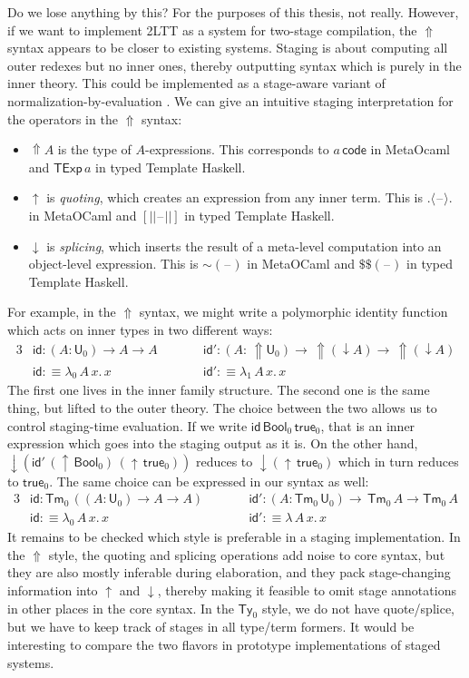 \documentclass[12pt,a4paper,twoside,openany]{book}
\theoremstyle{remark}
\theoremstyle{definition}
\theoremstyle{theorem}
\newcommand{\ms}[1]{\mathsf{#1}}
\newcommand{\id}{\mathsf{id}}
\newcommand{\Tm}{\mathsf{Tm}}
\newcommand{\Ty}{\mathsf{Ty}}
\newcommand{\U}{\mathsf{U}}
\newcommand{\blank}{\mathord{\hspace{1pt}\text{--}\hspace{1pt}}}
\newcommand{\Lift}{\Uparrow}
\newcommand{\Bool}{\ms{Bool}}
\newcommand{\true}{\ms{true}}
\newcommand{\up}{\uparrow}
\newcommand{\down}{\downarrow}
\newcommand{\lab}{\langle}
\newcommand{\rab}{\rangle}
\newcommand{\defn}{:\equiv}
\begin{document}
Do we lose anything by this? For the purposes of this thesis, not
really. However, if we want to implement 2LTT as a system for two-stage
compilation, the $\Lift$ syntax appears to be closer to existing systems.
Staging is about computing all outer redexes but no inner ones, thereby
outputting syntax which is purely in the inner theory. This could be implemented
as a stage-aware variant of normalization-by-evaluation
\cite{abel2013normalization,decidableconv,coqnbe}. We can give an intuitive
staging interpretation for the operators in the $\Lift$ syntax:
\begin{itemize}
\item
  $\Lift\!A$ is the type of $A$-expressions. This corresponds to $a\,\ms{code}$
  in MetaOcaml \cite{kiselyov14metaocaml} and $\ms{TExp}\,a$ in typed Template Haskell.
\item
  $\up$ is \emph{quoting}, which creates an expression from any inner term. This is
  $.\lab\blank\rab.$ in MetaOCaml and $[||\blank||]$ in typed Template Haskell.
\item $\down$ is \emph{splicing}, which inserts the result of a meta-level computation into
  an object-level expression. This is $\sim\!(\blank)$ in MetaOCaml and $\$\$(\blank)$ in typed Template Haskell.
\end{itemize}
For example, in the $\Lift$ syntax, we might write a polymorphic identity function
which acts on inner types in two different ways:
\begin{alignat*}{3}
  &\id : (A : \U_0) \to A \to A\hspace{2em} && \id' : (A :\,\Lift\!\U_0) \to\,\Lift\!(\down A) \to\,\Lift\!(\down A)\\
  &\id \defn \lambda_0\,A\,x.\,x && \id' \defn \lambda_1\,A\,x.\,x
\end{alignat*}
The first one lives in the inner family structure. The second one is the same
thing, but lifted to the outer theory. The choice between the two allows us to
control staging-time evaluation. If we write $\id\,\Bool_0\,\true_0$, that is an
inner expression which goes into the staging output as it is. On the other hand,
$\down(\id'\,(\up\,\Bool_0)\,(\up\,\true_0))$ reduces to $\down(\up\,\true_0)$
which in turn reduces to $\true_0$. The same choice can be expressed in our
syntax as well:
\begin{alignat*}{3}
  &\id : \Tm_0\,((A : \U_0) \to A \to A)\hspace{2em}&&\id' : (A : \Tm_0\,\U_0) \to\,\Tm_0\,A \to \Tm_0\,A\\
  &\id \defn \lambda_0\,A\,x.\,x &&\id' \defn \lambda\,A\,x.\,x
\end{alignat*}
It remains to be checked which style is preferable in a staging
implementation. In the $\Lift$ style, the quoting and splicing operations add
noise to core syntax, but they are also mostly inferable during elaboration, and
they pack stage-changing information into $\up$ and $\down$, thereby making it
feasible to omit stage annotations in other places in the core syntax. In the
$\Ty_0$ style, we do not have quote/splice, but we have to keep track of stages
in all type/term formers. It would be interesting to compare the two flavors
in prototype implementations of staged systems.
\end{document}

